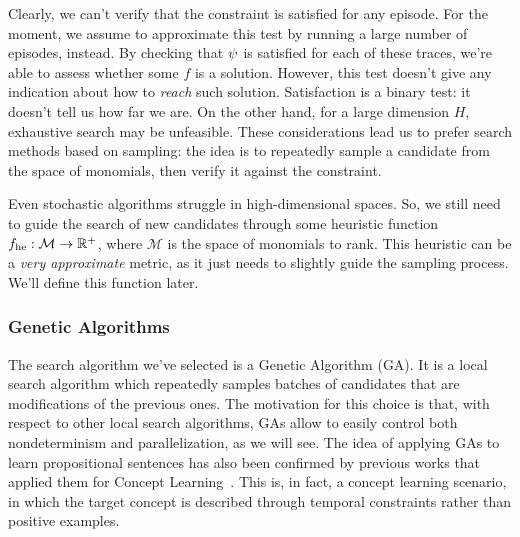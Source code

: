 Clearly, we can't verify that the constraint is satisfied for any episode. For
the moment, we assume to approximate this test by running a large number of
episodes, instead. By checking that $\psi$ is satisfied for each of
these traces, we're able to assess whether some $f$ is a solution. However,
this test doesn't give any indication about how to \emph{reach} such solution.
Satisfaction is a binary test: it doesn't tell us how far we are.  On the
other hand, for a large dimension $H$, exhaustive search may be unfeasible.
These considerations lead us to prefer search methods based on sampling: the
idea is to repeatedly sample a candidate from the space of monomials, then
verify it against the constraint.

Even stochastic algorithms struggle in high-dimensional spaces. So, we still
need to guide the search of new candidates through some heuristic function
$f_{\text{he}}: \mathcal{M} \to \mathbb{R}^+$, where $\mathcal{M}$ is the space of
monomials to rank. This heuristic can be a \emph{very approximate} metric, as
it just needs to slightly guide the sampling process. We'll define this
function later.


\subsubsection{Genetic Algorithms}

The search algorithm we've selected is a Genetic Algorithm
(GA). It is a local search algorithm which
repeatedly samples batches of candidates that are modifications of the
previous ones. The motivation for this choice is that, with respect to other
local search algorithms, GAs allow to easily control both nondeterminism and
parallelization, as we will see. The idea of applying GAs to learn
propositional sentences has also been confirmed by previous works that applied
them for Concept Learning~\cite{bib:ga-for-concepts}. This is, in fact, a
concept learning scenario, in which the target concept is described through
temporal constraints rather than positive examples.

